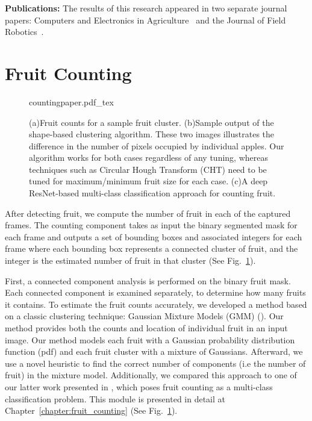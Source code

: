 \textbf{Publications:} The results of this research appeared in two separate journal papers: Computers and Electronics in Agriculture~\cite{roy2018arxiv} and the Journal of Field Robotics~\cite{hani_jfr_counting}. 



\section{Fruit Counting}\label{subsec:sysperframecounting}
\begin{figure}[!hbpt]
    \centering
    \def\svgwidth{\textwidth}
    {countingpaper.pdf_tex}
    \caption[Developed fruit counting algorithms.]{ (a)Fruit counts for a sample fruit cluster. (b)Sample output of the shape-based clustering algorithm. These two images illustrates the difference in the number of pixels occupied by individual apples. Our algorithm works for both cases regardless of any tuning, whereas techniques such as Circular Hough Transform (CHT) need to be tuned for maximum/minimum fruit size for each case. (c)A deep ResNet-based multi-class classification approach for counting fruit. }
    \label{fig:counting_papers}
\end{figure}

After detecting fruit, we compute the number of fruit in each of the captured frames. The counting component takes as input the binary segmented mask for each frame and outputs a set of bounding boxes and associated integers for each frame where each bounding box represents a connected cluster of fruit, and the integer is the estimated number of fruit in that cluster (See Fig.~\ref{fig:counting_papers}).

First, a connected component analysis is performed on the binary fruit mask. Each connected component is examined separately, to determine how many fruits it contains. To estimate the fruit counts accurately, we developed a method based on a classic clustering technique: Gaussian Mixture Models (GMM) (\cite{em}). Our method provides both the counts and location of individual fruit in an input image. Our method models each fruit with a Gaussian probability distribution function (pdf) and each fruit cluster with a mixture of Gaussians. Afterward, we use a novel heuristic to find the correct number of components (i.e the number of fruit) in the mixture model. Additionally, we compared this approach to one of our latter work presented in \cite{hani_apple_2018}, which poses fruit counting as a multi-class classification problem. This module is presented in detail at Chapter~\ref{chapter:fruit_counting} (See Fig.~\ref{fig:counting_papers}). 

